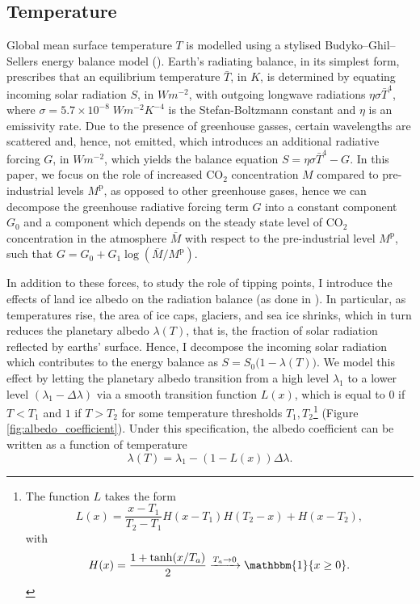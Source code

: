 \documentclass[../../main.tex]{subfiles}
\begin{document}
\subsection{Temperature}

Global mean surface temperature $T$ is modelled using a stylised Budyko–Ghil–Sellers energy balance model (\cite{hogg_glacial_2008, ashwin_extreme_2020}). Earth's radiating balance, in its simplest form, prescribes that an equilibrium temperature $\bar{T}$, in $\unit{K}$, is determined by equating incoming solar radiation $S$, in $\unit{W}\unit{m}^{-2}$, with outgoing longwave radiations $\eta \sigma \bar{T}^4$, where $\sigma = 5.7 \times 10^{-8} \; \unit{W} \unit{m}^{-2} \unit{K}^{-4}$ is the Stefan-Boltzmann constant and $\eta$ is an emissivity rate. Due to the presence of greenhouse gasses, certain wavelengths are scattered and, hence, not emitted, which introduces an additional radiative forcing $G$, in $\unit{W}\unit{m}^{-2}$, which yields the balance equation $S = \eta \sigma \bar{T}^4 - G$. In this paper, we focus on the role of increased CO$_2$ concentration $M$ compared to pre-industrial levels $M^{\mathrm{p}}$, as opposed to other greenhouse gases, hence we can decompose the greenhouse radiative forcing term $G$ into a constant component $G_0$ and a component which depends on the steady state level of CO$_2$ concentration in the atmosphere $\bar{M}$ with respect to the pre-industrial level $M^{\mathrm{p}}$, such that $G = G_0 + G_1 \log(\bar{M} / M^{\mathrm{p}})$.

In addition to these forces, to study the role of tipping points, I introduce the effects of land ice albedo on the radiation balance (as done in \cite{ghil_topics_2011,dijkstra_sensitivity_2015}). In particular, as temperatures rise, the area of ice caps, glaciers, and sea ice shrinks, which in turn reduces the planetary albedo $\lambda(T)$, that is, the fraction of solar radiation reflected by earths' surface. Hence, I decompose the incoming solar radiation which contributes to the energy balance as $S = S_0 \big(1 - \lambda(T)\big)$. We model this effect by letting the planetary albedo transition from a high level $\lambda_1$ to a lower level $(\lambda_1 - \Delta \lambda)$ via a smooth transition function $L(x)$, which is equal to $0$ if $T < T_1$ and $1$ if $T > T_2$ for some temperature thresholds $T_1, T_2$\footnote{
    The function $L$ takes the form \begin{equation}
        L(x) = \frac{x - T_1}{T_2 - T_1} H(x - T_1) H(T_2 - x) + H(x - T_2),
    \end{equation} with \begin{equation}
        H(x) = \frac{1 + \tanh(x / T_a)}{2} \xrightarrow{T_a \rightarrow 0} \mathbbm{1} \{x \geq 0\}.
    \end{equation}
} (Figure \ref{fig:albedo_coefficient}). Under this specification, the albedo coefficient can be written as a function of temperature \begin{equation} \label{eq:assumption:albedo}
    \lambda(T) = \lambda_1 - (1 - L(x)) \Delta \lambda.
\end{equation} 
\end{document}
